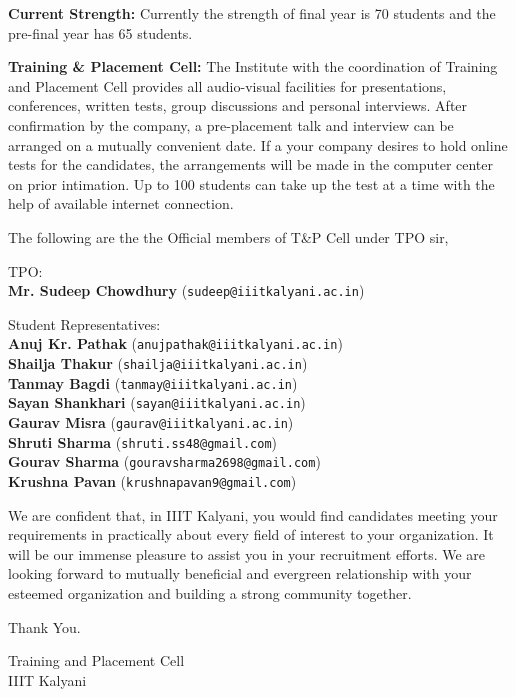 \documentclass[hidelinks, 11pt, a4paper]{letter}
\begin{document}
\begin{letter}{}
\textbf{Current Strength:} Currently the strength of final year is 70 students and the pre-final year has 65 students.

\textbf{Training \& Placement Cell:}
The Institute with the coordination of Training and Placement Cell provides all audio-visual facilities for presentations, conferences, written tests, group discussions and personal interviews. After confirmation by the company, a pre-placement talk and interview can be arranged on a mutually convenient date. If a your company desires to hold online tests for the candidates, the arrangements will be made in the computer center on prior intimation. Up to 100 students can take up the test at a time with the help of available internet connection.

The following are the the Official members of T\&P Cell under TPO sir,

TPO:
\\\textbf{Mr. Sudeep Chowdhury} (\texttt{sudeep@iiitkalyani.ac.in})

Student Representatives:
\\\textbf{Anuj Kr. Pathak} (\texttt{anujpathak@iiitkalyani.ac.in})
\\\textbf{Shailja Thakur} (\texttt{shailja@iiitkalyani.ac.in})
\\\textbf{Tanmay Bagdi} (\texttt{tanmay@iiitkalyani.ac.in})
\\\textbf{Sayan Shankhari} (\texttt{sayan@iiitkalyani.ac.in})
\\\textbf{Gaurav Misra} (\texttt{gaurav@iiitkalyani.ac.in})
\\\textbf{Shruti Sharma} (\texttt{shruti.ss48@gmail.com})
\\\textbf{Gourav Sharma} (\texttt{gouravsharma2698@gmail.com})
\\\textbf{Krushna Pavan} (\texttt{krushnapavan9@gmail.com})

We are confident that, in IIIT Kalyani, you would find candidates meeting your requirements in practically about every field of interest to your organization. It will be our immense pleasure to assist you in your recruitment efforts. We are looking forward to mutually beneficial and evergreen relationship with your esteemed organization and building a strong community together.

Thank You.

\closing{Training and Placement Cell \\IIIT Kalyani}
\end{letter}
\end{document}
